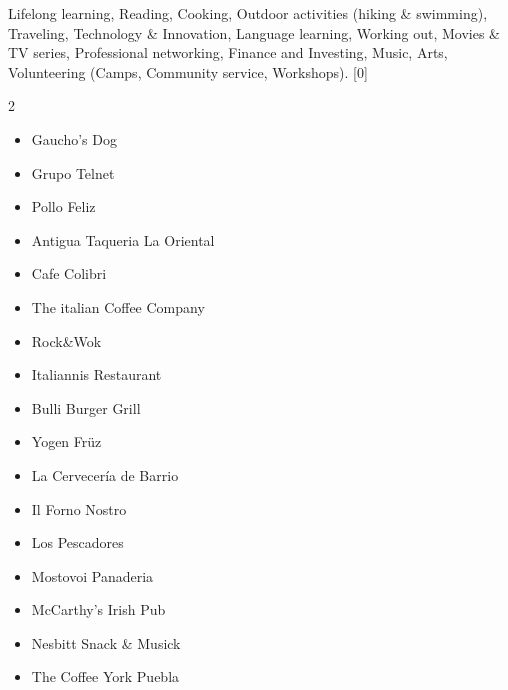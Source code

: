 \documentclass[a4paper,11pt]{article}
\begin{document}
Lifelong learning, Reading, Cooking, Outdoor activities (hiking \& swimming), Traveling, Technology \& Innovation, Language learning, Working out, Movies \& TV series, Professional networking, Finance and Investing, Music, Arts, Volunteering (Camps, Community service, Workshops).
\cvsection{}[0]
\begin{multicols}{2}
\begin{itemize}

        \item Gaucho's Dog \href{https://gauchos.ie/}{\faGlobe}
        \item Grupo Telnet \href{http://www.grupotelnet.com.mx/}{\faGlobe}
        \item Pollo Feliz \href{www.pollofeliz.com}{\faGlobe}
        \item Antigua Taqueria La Oriental \href{www.antiguataquerialaoriental.com}{\faGlobe}
        \item Cafe Colibri \href{www.colibripremium.com}{\faGlobe}
        \item The italian Coffee Company \href{www.italiancoffee.com}{\faGlobe}
        \item Rock\&Wok \href{www.rockandwok.com}{\faGlobe}
        \item Italiannis Restaurant \href{www.italiannis.com}{\faGlobe}
        \item Bulli Burger Grill \href{www.bulliburgergrill.com}{\faGlobe}
        \item Yogen Früz \href{https:\\www.yogenfruz.com}{\faGlobe}
        \item La Cervecería de Barrio \href{https://lacerveceriadebarriosucpolanco.shop}{\faGlobe}
        \item Il Forno Nostro \href{https://www.instagram.com/ilfornonostro/}{\faGlobe}
        \item Los Pescadores \href{https://jcarlos-rl.github.io/Pescadores/}{\faGlobe} 
        \item Mostovoi Panaderia \href{https://mostovoi.mx/}{\faGlobe}
        \item McCarthy's Irish Pub \href{https://www.mccarthyspub.com.mx/}{\faGlobe}  
        \item Nesbitt Snack \& Musick \href{https://wanderlog.com/place/details/3520474/nesbitt-snack--musick}{\faGlobe}
        \item The Coffee York Puebla \href{https://cafeteriasenpueblacoffeeyork.com/}{\faGlobe}

\end{itemize}
\end{multicols}
\end{document}
